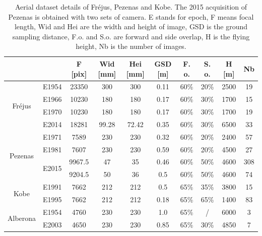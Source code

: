 \begin{table}[htbp]
	\scriptsize %
	\centering
	\begin{tabular}{||c|c||c|c|c|c|c|c|c|c||}\hline
\multicolumn{2}{||c||}{ } &   F [pix] &   Wid [mm] &   Hei [mm] &   GSD [m] &   F. o. &   S. o. &   H  [m] &   Nb \\\hline
\multirow{4}{*}{Fr{\'e}jus} & E1954 & 23350 & 300 & 300 & \color{black}0.11 & 60\% & 20\% & 2500 & 19\\
& E1966 & 10230 & 180 & 180 & \color{black}0.17 & 60\% & 30\% & 1700 & 15\\
& E1970 & 10230 & 180 & 180 & 0.17 & 60\% & 30\% & 1700 & 19\\
& E2014 & \color{black}18281 & 99.28 & 72.42 & 0.35 & 60\% & 30\% & 6500 & 33\\\hline
\multirow{4}{*}{Pezenas} & E1971 & 7589 & 230 & 230 & 0.32 &    60\% &    20\% & 2400 & 57\\
& E1981 & 7607 & 230 & 230 & 0.59 & 60\% & 20\% & 4500 & 27\\
& \multirow{2}{*}{E2015} & 9967.5 & 47 & 35 & 0.46 & 60\% & 50\% & 4600 & 308\\
&  & 9204.5 & 50 & 36 & 0.5 & 60\% & 50\% & 4600 & 74\\\hline
\multirow{2}{*}{Kobe}& E1991& 7662 & 212 & 212 & 0.5 &    65\% &    35\% & 3800 & 15\\
& E1995& 7662 & 212 & 212 & 0.18 & 65\% & 65\% & 1400 & 83\\\hline

\multirow{2}{*}{Alberona}& E1954 & 4760 & 230 & 230 & 1.0 & 65\% & / & 6000 & 3\\
& E2003 & 4650 & 230 & 230 & 0.85 & 65\% & 30\% & 4850 & 7 \\\hline
	\end{tabular}
	\caption{Aerial dataset details of Fr{\'e}jus, Pezenas and Kobe. The 2015 acquisition of Pezenas is obtained with two sets of camera. E stands for epoch, F means focal length, Wid and Hei are the width and height of image, GSD is the ground sampling distance, F.o. and S.o. are forward and side overlap, H is the flying height, Nb is the number of images.}
	\label{AerialData}
\end{table}

